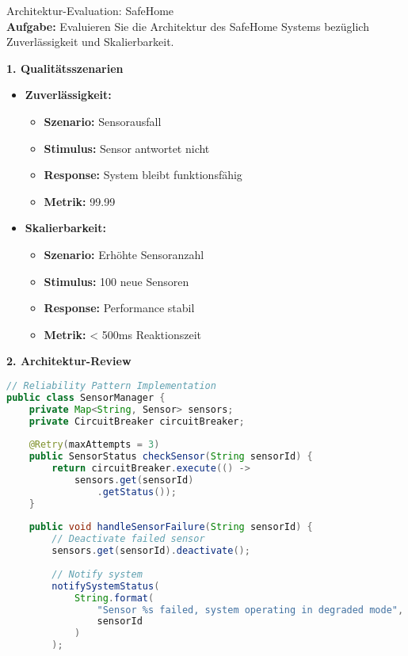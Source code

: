 \begin{example2}{Architektur-Evaluation: SafeHome}\\
\textbf{Aufgabe:} Evaluieren Sie die Architektur des SafeHome Systems bezüglich Zuverlässigkeit und Skalierbarkeit.

\textbf{1. Qualitätsszenarien}
\begin{itemize}
    \item \textbf{Zuverlässigkeit:}
    \begin{itemize}
        \item \textbf{Szenario:} Sensorausfall
        \item \textbf{Stimulus:} Sensor antwortet nicht
        \item \textbf{Response:} System bleibt funktionsfähig
        \item \textbf{Metrik:} 99.99%
    \end{itemize}
    
    \item \textbf{Skalierbarkeit:}
    \begin{itemize}
        \item \textbf{Szenario:} Erhöhte Sensoranzahl
        \item \textbf{Stimulus:} 100 neue Sensoren
        \item \textbf{Response:} Performance stabil
        \item \textbf{Metrik:} < 500ms Reaktionszeit
    \end{itemize}
\end{itemize}

\textbf{2. Architektur-Review}
\begin{lstlisting}[language=Java, style=basesmol]
// Reliability Pattern Implementation
public class SensorManager {
    private Map<String, Sensor> sensors;
    private CircuitBreaker circuitBreaker;
    
    @Retry(maxAttempts = 3)
    public SensorStatus checkSensor(String sensorId) {
        return circuitBreaker.execute(() -> 
            sensors.get(sensorId)
                .getStatus());
    }
    
    public void handleSensorFailure(String sensorId) {
        // Deactivate failed sensor
        sensors.get(sensorId).deactivate();
        
        // Notify system
        notifySystemStatus(
            String.format(
                "Sensor %s failed, system operating in degraded mode",
                sensorId
            )
        );
        

\end{lstlisting}
\end{example2}
